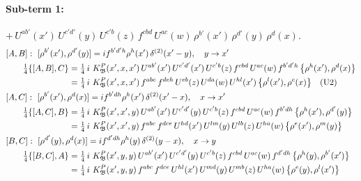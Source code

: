 \documentclass[10pt]{article}
\numberwithin{equation}{section}
\begin{document}
\paragraph{Sub-term 1:} $+\,U^{ab'}(x')\,U^{c'd'}(y)\,U^{c'b}(z)\,f^{cbd}\,U^{ac}(w)\,\rho^{b'}(x')\,\rho^{d'}(y)\,\rho^{d}(x)$.
\begin{align}
&[A,B]:\ [\rho^{b'}(x'),\rho^{d'}(y)]=i f^{b'd'h}\rho^{h}(x')\,\delta^{(2)}(x'-y),\quad y\to x'\notag\\
&\qquad \tfrac14\{[A,B],C\}=\tfrac14\,i\,\,K^{P}_{\mathfrak B}(x',x,x')\,U^{ab'}(x')\,U^{c'd'}(x')\,U^{c'b}(z)\,f^{cbd}\,U^{ac}(w)\,f^{b'd'h}\,\big\{\rho^{h}(x'),\rho^{d}(x)\big\}\notag\\
&\qquad\phantom{\tfrac14\{[A,B],C\}}=\tfrac14\,i\,\,K^{P}_{\mathfrak B}(x',x,x')\,f^{abc}\,f^{deh}\,U^{eb}(z)\,U^{da}(w)\,U^{hl}(x')\,\big\{\rho^{l}(x'),\rho^{c}(x)\big\}\quad\text{(U2)}
\label{B:eq:GIII.I.P-1-AB}\\
&[A,C]:\ [\rho^{b'}(x'),\rho^{d}(x)]=i f^{b'dh}\rho^{h}(x')\,\delta^{(2)}(x'-x),\quad x\to x'\notag\\
&\qquad \tfrac14\{[A,C],B\}=\tfrac14\,i\,\,K^{P}_{\mathfrak B}(x',x',y)\,U^{ab'}(x')\,U^{c'd'}(y)\,U^{c'b}(z)\,f^{cbd}\,U^{ac}(w)\,f^{b'dh}\,\big\{\rho^{h}(x'),\rho^{d'}(y)\big\}\notag\\
&\qquad\phantom{\tfrac14\{[A,C],B\}}=\tfrac14\,i\,\,K^{P}_{\mathfrak B}(x',x',y)\,f^{abc}\,f^{dce}\,U^{hd}(x')\,U^{lm}(y)\,U^{lb}(z)\,U^{ha}(w)\,\big\{\rho^{e}(x'),\rho^{m}(y)\big\}
\label{B:eq:GIII.I.P-1-AC}\\
&[B,C]:\ [\rho^{d'}(y),\rho^{d}(x)]=i f^{d'dh}\rho^{h}(y)\,\delta^{(2)}(y-x),\quad x\to y\notag\\
&\qquad \tfrac14\{[B,C],A\}=\tfrac14\,i\,\,K^{P}_{\mathfrak B}(x',y,y)\,U^{ab'}(x')\,U^{c'd'}(y)\,U^{c'b}(z)\,f^{cbd}\,U^{ac}(w)\,f^{d'dh}\,\big\{\rho^{h}(y),\rho^{b'}(x')\big\}\notag\\
&\qquad\phantom{\tfrac14\{[B,C],A\}}=\tfrac14\,i\,\,K^{P}_{\mathfrak B}(x',y,y)\,f^{abc}\,f^{dce}\,U^{hl}(x')\,U^{md}(y)\,U^{mb}(z)\,U^{ha}(w)\,\big\{\rho^{e}(y),\rho^{l}(x')\big\}
\label{B:eq:GIII.I.P-1-BC}
\end{align}
\end{document}
